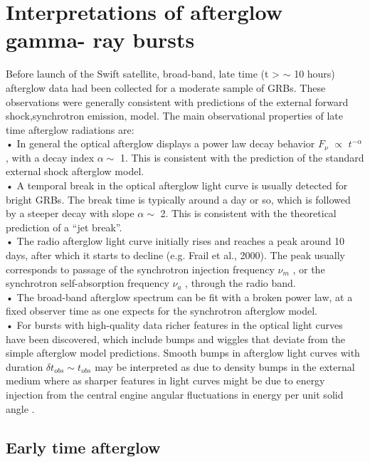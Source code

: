 \section{Interpretations of afterglow gamma- ray bursts }
Before launch of the Swift satellite, broad-band, late time (t > $ \sim $ 10 hours) afterglow data had been collected for a moderate sample of GRBs. These observations were generally consistent with predictions of the external forward shock,synchrotron emission, model. The main observational properties of late time afterglow radiations are:\\
• In general the optical afterglow displays a power law decay behavior $ F_{\nu} $ $ \propto $ $ t^{-\alpha} $   , with a decay index $ \alpha \sim $ 1. This is consistent with the prediction of the standard external shock afterglow model.\\
• A temporal break in the optical afterglow light curve is usually detected for bright GRBs. The break time is typically around a day or so, which is followed by a steeper decay with slope $ \alpha  \sim $ 2. This is consistent with the theoretical prediction of a “jet break”.\\
• The radio afterglow light curve initially rises and reaches a peak around
10 days, after which it starts to decline (e.g. Frail et al., 2000). The peak
usually corresponds to passage of the synchrotron injection frequency $ \nu_{m} $ ,
or the synchrotron self-absorption frequency $ \nu_{a} $ , through the radio band.\\
• The broad-band afterglow spectrum can be fit with a broken power law, at
a fixed observer time as one expects for the synchrotron afterglow model.\\
• For bursts with high-quality data richer features in the optical light curves have been discovered, which include bumps and wiggles that deviate from the simple afterglow model predictions. Smooth bumps in afterglow light curves with duration $ \delta  t _{obs}  \sim  t_{obs} $ may be interpreted as due to density bumps in the external medium  where as sharper features in light curves might be due to energy injection from the central engine  angular fluctuations in energy per unit solid angle \citep{18}.
\subsection{ Early time afterglow }
